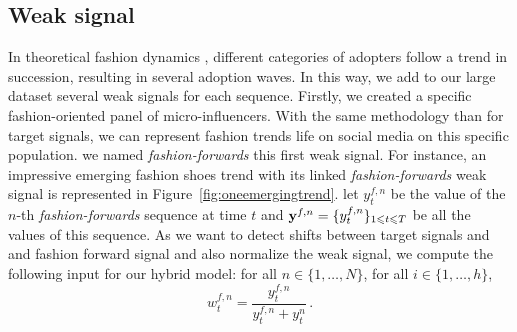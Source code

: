 \documentclass{article} %
\newcommand{\ts}{y}
\newcommand{\fullts}{{\bf \ts}}
\newcommand{\lag}{h}
\newcommand{\ws}{w}
\begin{document}
\begin{table}
  \caption{Fashion time series overview. For each couple geozone/category, we give the number of female and male trends (Female/Male)}
  \label{sample-table}
  \centering
\end{table}
\label{tab:fashiondataset}
\subsection{Weak signal}

In theoretical fashion dynamics \citep{rogersdiffusion}, different categories of adopters follow a trend in succession, resulting in several adoption waves. In this way, we add to our large dataset several weak signals for each sequence.
Firstly, we created a specific fashion-oriented panel of micro-influencers. With the same methodology than for target signals, we can represent  fashion trends life on social media on this specific population. we named \textit{fashion-forwards} this first weak signal. For instance, an impressive emerging fashion shoes trend with its linked \textit{fashion-forwards} weak signal is represented in Figure~\ref{fig:oneemergingtrend}. 
let $\ts_t^{f,n}$ be the value of the $n$-th \textit{fashion-forwards} sequence at time $t$ and  $\fullts^{f,n} = \{\ts_t^{f,n}\}_{1\leqslant t \leqslant T}$ be all the values of this sequence.
As we want to detect shifts between target signals and and fashion forward signal and also normalize the weak signal, we compute the following input for our hybrid model:
for all $n \in \{1,\ldots,N\}$, for all $i \in \{1,\ldots,\lag\}$,
$$
\ws^{f,n}_{t} = \frac{\ts_t^{f,n}}{\ts_t^{f,n}+\ts_t^{n}}\,.
$$
\end{document}
